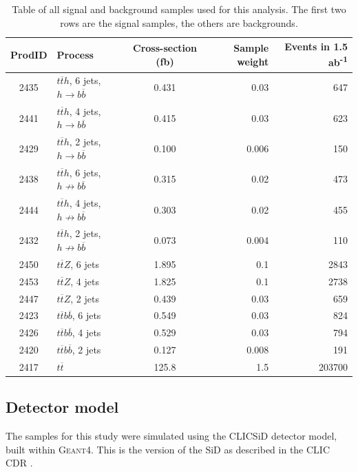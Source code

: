 \begin{table}[htp]
\centering
	\begin{tabular}{ c l c r r }
	\hline \hline
	\textbf{ProdID} & \textbf{Process} & \textbf{Cross-section (fb)} & \textbf{Sample weight} & \textbf{Events in 1.5 ab\textsuperscript{-1}} \\ \hline
	2435 & $t\overline{t}h$, 6 jets, $h \rightarrow b\overline{b}$ & 0.431 & 0.03 & 647 \\
	2441 & $t\overline{t}h$, 4 jets, $h \rightarrow b\overline{b}$ & 0.415 & 0.03 & 623 \\ \hline
	2429 & $t\overline{t}h$, 2 jets, $h \rightarrow b\overline{b}$ & 0.100 & 0.006 & 150 \\

	2438 & $t\overline{t}h$, 6 jets, $h \not\rightarrow b\overline{b}$ & 0.315 & 0.02 & 473	 \\
	2444 & $t\overline{t}h$, 4 jets, $h \not\rightarrow b\overline{b}$ & 0.303 & 0.02 & 455 \\
	2432 & $t\overline{t}h$, 2 jets, $h \not\rightarrow b\overline{b}$ & 0.073 & 0.004 & 110 \\

	2450 & $t\overline{t}Z$, 6 jets & 1.895 & 0.1 & 2843 \\
	2453 & $t\overline{t}Z$, 4 jets & 1.825 & 0.1 & 2738 \\
	2447 & $t\overline{t}Z$, 2 jets & 0.439 & 0.03 & 659 \\
	
	2423 & $t\overline{t}b\overline{b}$, 6 jets & 0.549 & 0.03 & 824 \\
	2426 & $t\overline{t}b\overline{b}$, 4 jets & 0.529 & 0.03 & 794 \\
	2420 & $t\overline{t}b\overline{b}$, 2 jets & 0.127 & 0.008 & 191 \\

	2417 & $t\overline{t}$ & 125.8 & 1.5 & 203700 \\ \hline \hline

	\end{tabular}
	\caption{Table of all signal and background samples used for this analysis. The first two rows are the signal samples, the others are backgrounds.}
	\label{table:physics/SM/generatedsamples}
\end{table}

\subsection{Detector model}
The samples for this study were simulated using the CLIC\textunderscore SiD detector model, built within \textsc{Geant4}\cite{clic-sid-geant4}. This is the version of the \acrfull{SiD} as described in the \acrlong{CLIC} \acrfull{CDR}  .

